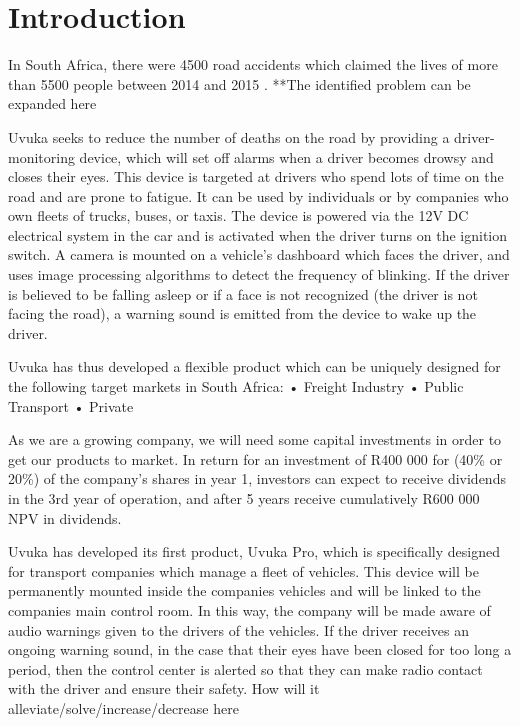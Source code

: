 \cleardoublepage
{}
{}

\newpage

\cleardoublepage
{}
{}
\listoffigures
\newpage

\chapter{Introduction}
In South Africa, there were 4500 road accidents which claimed the lives of more than 5500 people between 2014 and 2015 \cite{EWNRoadDeaths}. **The identified problem can be expanded here

Uvuka seeks to reduce the number of deaths on the road by providing a driver-monitoring device, which will set off alarms when a driver becomes drowsy and closes their eyes. This device is targeted at drivers who spend lots of time on the road and are prone to fatigue. It can be used by individuals or by companies who own fleets of trucks, buses, or taxis. The device is powered via the 12V DC electrical system in the car and is activated when the driver turns on the ignition switch. A camera is mounted on a vehicle's dashboard which faces the driver, and uses image processing algorithms to detect the frequency of blinking. If the driver is believed to be falling asleep or if a face is not recognized (the driver is not facing the road), a warning sound is emitted from the device to wake up the driver. 

Uvuka has thus developed a flexible product which can be uniquely designed for the following target markets in South Africa:
•	Freight Industry 
•	Public Transport
•	Private





As we are a growing company, we will need some capital investments in order to get our products to market. In return for an investment of R400 000 for (40\% or 20\%) of the company’s shares in year 1, investors can expect to receive dividends in the 3rd year of operation, and after 5 years receive cumulatively R600 000 NPV in dividends.

Uvuka has developed its first product, Uvuka Pro, which is specifically designed for transport companies which manage a fleet of vehicles. This device will be permanently mounted inside the companies vehicles and will be linked to the companies main control room. In this way, the company will be made aware of audio warnings given to the drivers of the vehicles. If the driver receives an ongoing warning sound, in the case that their eyes have been closed for too long a period, then the control center is alerted so that they can make radio contact with the driver and ensure their safety. 
How will it alleviate/solve/increase/decrease here



